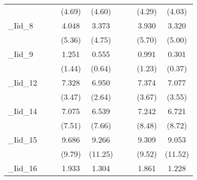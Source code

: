 {\begin{tabular}{l*{8}{c}}
            &                     &                     &      (4.69)         &      (4.60)         &                     &                     &      (4.29)         &      (4.03)         \\
[1em]
\_Iid\_8      &                     &                     &       4.048\sym{***}&       3.373\sym{***}&                     &                     &       3.930\sym{***}&       3.320\sym{***}\\
            &                     &                     &      (5.36)         &      (4.75)         &                     &                     &      (5.70)         &      (5.00)         \\
[1em]
\_Iid\_9      &                     &                     &       1.251         &       0.555         &                     &                     &       0.991         &       0.301         \\
            &                     &                     &      (1.44)         &      (0.64)         &                     &                     &      (1.23)         &      (0.37)         \\
[1em]
\_Iid\_12     &                     &                     &       7.328\sym{***}&       6.950\sym{**} &                     &                     &       7.374\sym{***}&       7.077\sym{***}\\
            &                     &                     &      (3.47)         &      (2.64)         &                     &                     &      (3.67)         &      (3.55)         \\
[1em]
\_Iid\_14     &                     &                     &       7.075\sym{***}&       6.539\sym{***}&                     &                     &       7.242\sym{***}&       6.721\sym{***}\\
            &                     &                     &      (7.51)         &      (7.66)         &                     &                     &      (8.48)         &      (8.72)         \\
[1em]
\_Iid\_15     &                     &                     &       9.686\sym{***}&       9.266\sym{***}&                     &                     &       9.309\sym{***}&       9.053\sym{***}\\
            &                     &                     &      (9.79)         &     (11.25)         &                     &                     &      (9.52)         &     (11.52)         \\
[1em]
\_Iid\_16     &                     &                     &       1.933         &       1.304         &                     &                     &       1.861         &       1.228         \\

\end{tabular}}
